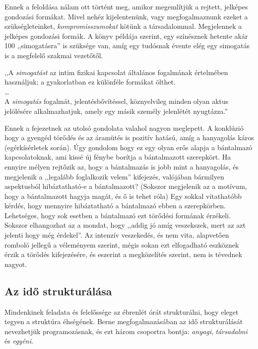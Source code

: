 \documentclass[a4paper,12pt]{article}
\begin{document}
	Ennek a feloldása nálam ott történt meg, amikor megemlítjük a rejtett, jelképes gondozási formákat. Mivel nehéz kijelentenünk, vagy megfogalmaznunk ezeket a szükségleteinket, \textit{kompromisszumokat} kötünk a társadalommal. Megjelennek a jelképes gondozási formák. A könyv példája szerint, egy színésznek hetente akár 100 ,,simogatásra'' is szüksége van, amíg egy tudósnak évente elég egy simogatás is a megfelelő szakmai vezetőtől.
	
	\begin{flushright}
		{\footnotesize 		,,A \textit{simogatást} az intim fizikai kapcsolat általános fogalmának értelmében használjuk; a gyakorlatban ez különféle formákat  ölthet.\\ \dots \\ 
		A \textit{simogatás}  fogalmát, jelentésbővítéssel, köznyelvileg minden olyan aktus jelölésére alkalmazhatjuk, amely egy másik személy jelenlétét nyugtázza.''}
	\end{flushright}

	Ennek a fejezetnek az utolsó gondolata valahol nagyon meglepett. A konklúzió hogy a gyengéd törődés és az áramütés is pozitív hatású, amíg a hanyagolás káros (egérkísérletek során).
	Úgy gondolom hogy ez egy olyan erős alapja a bántalmazó kapcsolatoknak, ami kissé új fénybe borítja a bántalmazott szerepkört. Ha ennyire mélyen rejtőzik az, hogy a bántalmazás is jobb mint a hanyagolás, és megjelenik a ,,legalább foglalkozik velem'' kifejezés, valójában bármilyen aspektusból hibáztatható-e a bántalmazott? (Sokszor megjelenik az a motívum, hogy a bántalmazott hagyja magát, és ő is tehet róla) Egy sokkal vitathatóbb kérdés, hogy mennyire hibáztatható a bántalmazó ebben a szerepkörben. Lehetséges, hogy sok esetben a bántalmazó ezt törődési formának érzékeli. Sokszor elhangozhat az a mondat, hogy ,,addig jó amíg veszekszek, mert az azt jelenti hogy még érdekel''. Az intenzív veszekedés, és nem vita, alapvetően romboló jellegű a véleményem szerint, mégis sokan ezt elfogadható eszköznek érzik a törődés kifejezésére, és eszerint a megközelítés szerint, nem is tévednek nagyot.
	

	\subsection{Az idő strukturálása}
	Mindenkinek feladata és felelőssége az ébrenlét órát strukturálni, hogy eleget tegyen a struktúra éhségének. Berne megfogalmazásában az idő strukturálását nevezhetjük programozásnak, és ezt három csoportra bontja: \textit{anyagi}, \textit{társadalmi} és \textit{egyéni}.
	
\end{document}

